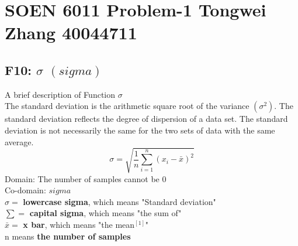 \documentclass[12pt]{report}
\begin{document}
\section*{SOEN 6011 Problem-1 Tongwei Zhang  40044711}
\vspace{-0.4cm}
\subsection*{F10: $\sigma$  $(sigma)$}
\vspace{-0.3cm}
A brief description of Function $\sigma$ \\
The standard deviation is the arithmetic square root of the variance $(\sigma^2)$. The standard deviation reflects the degree of dispersion of a data set. The standard deviation is not necessarily the same for the two sets of data with the same average.
   $$\sigma=\sqrt{\frac{1}{n}{\sum_{i=1}^n(x_i-\bar{x})^2}}$$
Domain: The number of samples cannot be 0\\
Co-domain: $sigma$ \\
$\sigma =$ \textbf{lowercase sigma}, which means "Standard deviation"\\
$\sum =$ \textbf{capital sigma}, which means "the sum of"\\
$\bar{x} =$ \textbf{x bar}, which means "the mean$^{[1]}$"\\
n means \textbf{the number of samples}\\
\vspace{-0.4cm}
\begin{center}
\end{center}
\end{document}

